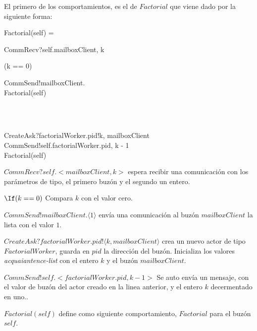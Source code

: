 El primero de los comportamientos, es el de $Factorial$ que viene dado por la siguiente forma:
\begin{process}
Factorial(self) = {} \\ \quad
  \begin{block}
  CommRecv?self.\langle mailboxClient, k \rangle \then {} \\ \quad
    \begin{block}
    \If (k == 0) \Then {} \\ \quad
      \begin{block} 
      CommSend!mailboxClient. \rangle \then \\
      Factorial(self) 
      \end{block} \\
    \Else {} \\ \quad
      \begin{block}
      CreateAsk?factorialWorker.pid!\langle k, mailboxClient \rangle \then \\
      CommSend!self.\langle factorialWorker.pid, k - 1 \rangle \then \\
      Factorial(self)
      \end{block}
    \end{block}
  \end{block}
\end{process}


\begin{description}
 \item $CommRecv?self.<mailboxClient, k>$ espera recibir una comunicación con los parámetros de tipo, el primero buzón y el segundo un entero.
 \item $\If (k == 0)$ Compara $k$ con el valor cero.
 \item $CommSend!mailboxClient.\langle 1 \rangle$ envía una comunicación al buzón $mailboxClient$ la lista con el valor $1$.
 \item $CreateAsk?factorialWorker.pid!\langle k, mailboxClient \rangle$ crea un nuevo actor de tipo $FactorialWorker$, guarda en $pid$ la dirección del buzón. Inicializa los valores \textit{acquaiantence-list} con el entero $k$ y el buzón $mailboxClient$.
 \item $CommSend!self.<factorialWorker.pid, k - 1 >$ Se auto envía un mensaje, con el valor de buzón del actor creado en la linea anterior, y el entero $k$ decermentado en uno..
 \item $Factorial(self)$ define como siguiente comportamiento, $Factorial$ para el buzón $self$.
\end{description}

